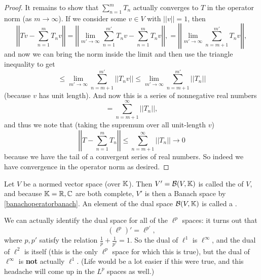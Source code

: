 \begin{proof}
It remains to show that $\sum_{n=1}^m T_n$ actually converges to $T$ in the operator norm (as $m \to \infty$). If we consider some $v \in V$ with $||v|| = 1$, then 
\[
    \boxed{\left|\left|Tv - \sum_{n=1}^m T_n v\right|\right|} = \left|\left| \lim_{m' \to \infty} \sum_{n=1}^{m'} T_n v - \sum_{n=1}^m T_n v\right|\right|, = \left|\left| \lim_{m' \to \infty} \sum_{n = m+1}^{m'} T_n v\right|\right|,
\]
and now we can bring the norm inside the limit and then use the triangle inequality to get
\[
    \le \lim_{m' \to \infty} \sum_{n = m+1}^{m'} ||T_n v|| \le \lim_{m' \to \infty} \boxed{\sum_{n=m+1}^{m'} ||T_n||}
\]
(because $v$ has unit length). And now this is a series of nonnegative real numbers
\[
    = \sum_{n = m+1}^{\infty} ||T_n||,
\]
and thus we note that (taking the supremum over all unit-length $v$)
\[
    \left|\left|T - \sum_{n=1}^m T_n\right|\right| \le \sum_{n = m+1}^{\infty} ||T_n|| \to 0
\]  
because we have the tail of a convergent series of real numbers. So indeed we have convergence in the operator norm as desired.  
\end{proof}

\begin{definition}
Let $V$ be a normed vector space (over $\mathbb K$). Then $V' = \mathcal{B}(V, \mathbb K)$ is called the  of $V$, and because $\mathbb K = \mathbb R, \mathbb C$ are both complete, $V'$ is then a Banach space by \cref{banachoperatorbanach}. An element of the dual space $\mathcal{B}(V, \mathbb K)$ is called a .
\end{definition}

We can actually identify the dual space for all of the $\ell^p$ spaces: it turns out that
\[
    (\ell^p)' = \ell^{p'},
\]
where $p, p'$ satisfy the relation $\frac{1}{p} + \frac{1}{p'} = 1$. So the dual of $\ell^1$ is $\ell^{\infty}$, and the dual of $\ell^2$ is itself (this is the only $\ell^p$ space for which this is true), but the dual of $\ell^{\infty}$ is \textbf{not} actually $\ell^1$. (Life would be a lot easier if this were true, and this headache will come up in the $L^p$ spaces as well.)